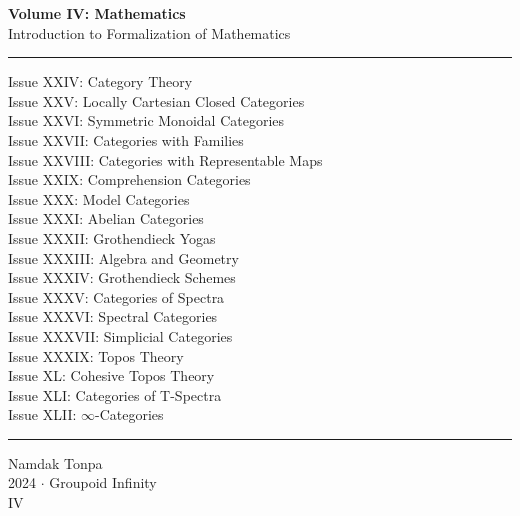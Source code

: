 \documentclass{article}
\begin{document}
\begin{titlepage}
    \centering
    \vspace*{0.5in}
    \Huge
    \textbf{Volume IV: Mathematics} \\
    \LARGE
    Introduction to Formalization of Mathematics \\
    \vspace{1.5in}
    \rule{\textwidth}{0.4pt}
    \small
    \flushleft
    Issue XXIV: Category Theory \\
    Issue XXV: Locally Cartesian Closed Categories \\
    Issue XXVI: Symmetric Monoidal Categories \\
    Issue XXVII: Categories with Families \\
    Issue XXVIII: Categories with Representable Maps \\
    Issue XXIX: Comprehension Categories \\
    Issue XXX: Model Categories \\
    Issue XXXI: Abelian Categories \\
    Issue XXXII: Grothendieck Yogas \\
    Issue XXXIII: Algebra and Geometry \\
    Issue XXXIV: Grothendieck Schemes \\
    Issue XXXV: Categories of Spectra \\
    Issue XXXVI: Spectral Categories \\
    Issue XXXVII: Simplicial Categories \\
    Issue XXXIX: Topos Theory \\
    Issue XL: Cohesive Topos Theory \\
    Issue XLI: Categories of T-Spectra \\
    Issue XLII: $\infty$-Categories \\
    \rule{\textwidth}{0.4pt}
    \centering
    \vfill
    \large
    Namdak Tonpa \\
    \Large
    2024 $\cdot$ Groupoid Infinity \\
    IV
\end{titlepage}
\end{document}

